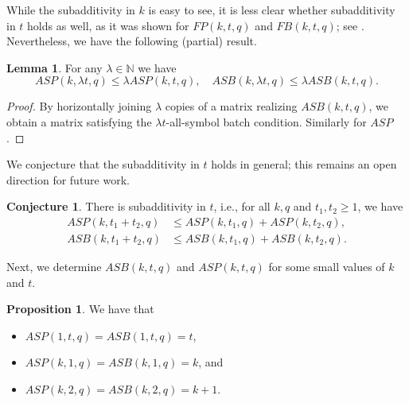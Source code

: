 \documentclass[11pt,a4paper]{article}
\theoremstyle{definition}
\newtheorem{proposition}[theorem]{Proposition}
\newtheorem{conjecture}{Conjecture}
\newtheorem{lemma}[theorem]{Lemma}
\begin{document}
While the subadditivity in $k$ is easy to see, it is less clear whether subadditivity in $t$ holds as well, as it was shown for $FP(k,t,q)$ and $FB(k,t,q)$; see \cite[Proposition 2.6]{KILIC2025}. Nevertheless, we have the following (partial) result.

\begin{lemma}
    For any $\lambda\in \mathbb{N}$ we have 
    $$
        ASP(k,\lambda t,q)\leq  \lambda ASP(k,t,q), \quad ASB(k,\lambda t,q)\leq  \lambda ASB(k,t,q).
    $$
\end{lemma}
\begin{proof}
    By horizontally joining $\lambda$ copies of a matrix realizing $ASB(k,t,q)$, we obtain a matrix satisfying the $\lambda t$-all-symbol batch condition. Similarly for $ASP$.
\end{proof}

We conjecture that the subadditivity in $t$ holds in general; this remains an open direction for future work.
\begin{conjecture}
    There is subadditivity in $t$, i.e., for all $k,q$ and $t_1,t_2\geq1$, we have 
    \begin{align*}
        ASP(k,t_1+t_2,q)&\leq ASP(k,t_1,q)+ASP(k,t_2,q), \\
        ASB(k,t_1+t_2,q)&\leq ASB(k,t_1,q)+ASB(k,t_2,q).
    \end{align*}
\end{conjecture}

Next, we determine $ASB(k,t,q)$ and $ASP(k,t,q)$ for some small values of $k$ and $t$.

\begin{proposition}\label{prop:k=1_t=1_t=2}
    We have that
    \begin{itemize}
        \item[(i)] $ASP(1,t,q) = ASB(1,t,q)=t$,
        \item [(ii)] $ASP(k,1,q) = ASB(k,1,q) =k$, and 
        \item [(iii)] $ASP(k,2,q) = ASB(k,2,q) = k + 1$.
    \end{itemize}
\end{proposition}
\end{document}
